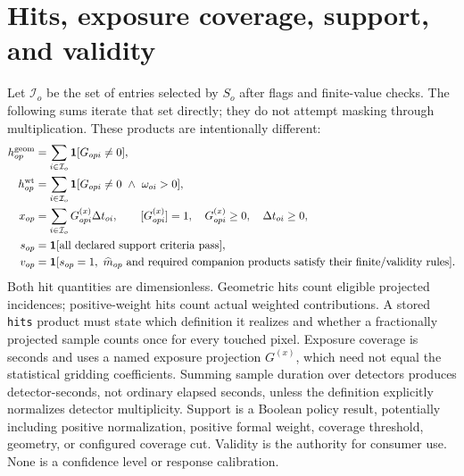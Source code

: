 \documentclass[11pt]{article}
\newcommand{\code}[1]{\nolinkurl{#1}}
\begin{document}
\section{Hits, exposure coverage, support, and validity}

Let \(\mathcal I_o\) be the set of entries selected by \(S_o\) after flags and
finite-value checks. The following sums iterate that set directly; they do not
attempt masking through multiplication. These products are intentionally
different:
\begin{align}
 h^{\rm geom}_{op}&=\sum_{i\in\mathcal I_o}\mathbf 1[G_{opi}\neq0],
 \label{eq:hits}\\
 h^{\rm wt}_{op}&=\sum_{i\in\mathcal I_o}
 \mathbf 1[G_{opi}\neq0\ \land\ \omega_{oi}>0],
 \label{eq:weighted-hits}\\
 x_{op}&=\sum_{i\in\mathcal I_o}G^{(x)}_{opi}\Delta t_{oi},
 \qquad [G^{(x)}_{opi}]=1,\quad G^{(x)}_{opi}\geq0,
 \quad\Delta t_{oi}\geq0,
 \label{eq:coverage}\\
 s_{op}&=\mathbf 1[\hbox{all declared support criteria pass}],
 \label{eq:support}\\
 v_{op}&=\mathbf 1[s_{op}=1,\ \widehat m_{op}\hbox{ and required companion
 products satisfy their finite/validity rules}].
 \label{eq:validity}
\end{align}
Both hit quantities are dimensionless. Geometric hits count eligible projected
incidences; positive-weight hits count actual weighted contributions. A stored
\code{hits} product must state which definition it realizes and whether a
fractionally projected sample counts once for every touched pixel. Exposure
coverage is seconds and uses a named exposure projection \(G^{(x)}\), which
need not equal the statistical gridding coefficients. Summing sample duration
over detectors produces detector-seconds, not ordinary elapsed seconds, unless
the definition explicitly normalizes detector multiplicity. Support is a
Boolean policy result, potentially including positive normalization, positive
formal weight, coverage threshold, geometry, or configured coverage cut.
Validity is the authority for consumer use. None is a confidence level or
response calibration.
\end{document}
